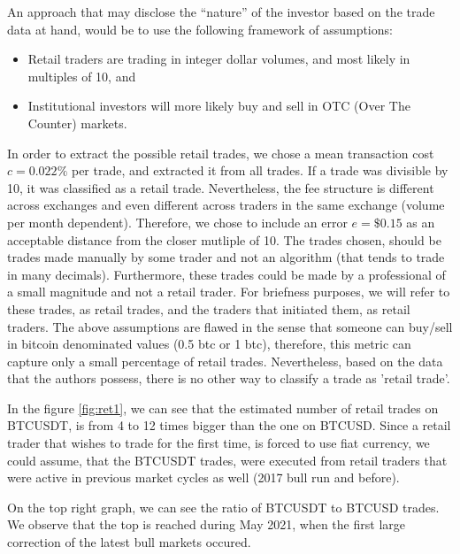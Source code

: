 \documentclass[10pt]{asme2ej}
\begin{document}
An approach that may disclose the “nature” of the investor based on the trade data at hand, would be to use the following framework of assumptions: 
\begin{itemize}
	\item Retail traders are trading in integer dollar volumes, and most likely in multiples of 10, and
	\item Institutional investors will more likely buy and sell in OTC (Over The Counter) markets.
\end{itemize} 

In order to extract the possible retail trades, we chose a mean transaction cost \( c = 0.022\% \) per trade, and extracted it from all trades. If a trade was divisible by 10, it was classified as a retail trade. Nevertheless, the fee structure is different across exchanges and even different across traders in the same exchange (volume per month dependent). Therefore, we chose to include an error \(e = \$0.15 \) as an acceptable distance from the closer mutliple of 10. The trades chosen, should be trades made manually by some trader and not an algorithm (that tends to trade in many decimals). Furthermore, these trades could be made by a professional of a small magnitude and not a retail trader. For briefness purposes, we will refer to these trades, as retail trades, and the traders that initiated them, as retail traders. The above assumptions are flawed in the sense that someone can buy/sell in bitcoin denominated  values (0.5 btc or 1 btc), therefore, this metric can capture only a small percentage of retail trades. Nevertheless, based on the data that the authors possess, there is no other way to classify a trade as 'retail trade'.

In the figure \ref{fig:ret1}, we can see that the estimated number of retail trades on BTCUSDT, is from 4 to 12 times bigger than the one on BTCUSD. Since a retail trader that wishes to trade for the first time, is forced to use fiat currency, we could assume, that the BTCUSDT trades, were executed from retail traders that were active in previous market cycles as well (2017 bull run and before). 

On the top right graph, we can see the ratio of BTCUSDT to BTCUSD trades. We observe that the top is reached during May 2021, when the first large correction of the latest bull markets occured. 
\end{document}
